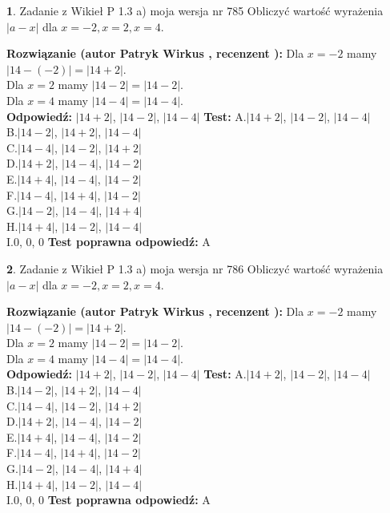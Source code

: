 \documentclass[12pt, a4paper]{article}
\theoremstyle{definition} %
\newtheorem{zad}{}
\newcommand{\zadStart}[1]{\begin{zad}#1\newline}
\newcommand{\zadStop}{\end{zad}}
\newcommand{\rozwStart}[2]{\noindent \textbf{Rozwiązanie (autor #1 , recenzent #2): }\newline}
\newcommand{\rozwStop}{\newline}
\newcommand{\odpStart}{\noindent \textbf{Odpowiedź:}\newline}
\newcommand{\odpStop}{\newline}
\newcommand{\testStart}{\noindent \textbf{Test:}\newline}
\newcommand{\testStop}{\newline}
\newcommand{\kluczStart}{\noindent \textbf{Test poprawna odpowiedź:}\newline}
\newcommand{\kluczStop}{\newline}
\begin{document}
\zadStart{Zadanie z Wikieł P 1.3 a) moja wersja nr 785}
Obliczyć wartość wyrażenia $|a - x|$ dla $x=-2,x=2,x=4$.
\zadStop
\rozwStart{Patryk Wirkus}{}
Dla $x = -2$ mamy $|14 - (-2)| = |14 + 2|$.\\
Dla $x = 2$ mamy $|14 - 2| = |14 - 2|$.\\
Dla $x = 4$ mamy $|14 - 4| = |14 - 4|$.\\
\rozwStop
\odpStart
$|14 + 2|$, $|14 - 2|$, $|14 - 4|$
\odpStop
\testStart
A.$|14 + 2|$, $|14 - 2|$, $|14 - 4|$\\
B.$|14 - 2|$, $|14 + 2|$, $|14 - 4|$\\
C.$|14 - 4|$, $|14 - 2|$, $|14 + 2|$\\
D.$|14 + 2|$, $|14 - 4|$, $|14 - 2|$\\
E.$|14 + 4|$, $|14 - 4|$, $|14 - 2|$\\
F.$|14 - 4|$, $|14 + 4|$, $|14 - 2|$\\
G.$|14 - 2|$, $|14 - 4|$, $|14 + 4|$\\
H.$|14 + 4|$, $|14 - 2|$, $|14 - 4|$\\
I.$0$, $0$, $0$
\testStop
\kluczStart
A
\kluczStop



\zadStart{Zadanie z Wikieł P 1.3 a) moja wersja nr 786}
Obliczyć wartość wyrażenia $|a - x|$ dla $x=-2,x=2,x=4$.
\zadStop
\rozwStart{Patryk Wirkus}{}
Dla $x = -2$ mamy $|14 - (-2)| = |14 + 2|$.\\
Dla $x = 2$ mamy $|14 - 2| = |14 - 2|$.\\
Dla $x = 4$ mamy $|14 - 4| = |14 - 4|$.\\
\rozwStop
\odpStart
$|14 + 2|$, $|14 - 2|$, $|14 - 4|$
\odpStop
\testStart
A.$|14 + 2|$, $|14 - 2|$, $|14 - 4|$\\
B.$|14 - 2|$, $|14 + 2|$, $|14 - 4|$\\
C.$|14 - 4|$, $|14 - 2|$, $|14 + 2|$\\
D.$|14 + 2|$, $|14 - 4|$, $|14 - 2|$\\
E.$|14 + 4|$, $|14 - 4|$, $|14 - 2|$\\
F.$|14 - 4|$, $|14 + 4|$, $|14 - 2|$\\
G.$|14 - 2|$, $|14 - 4|$, $|14 + 4|$\\
H.$|14 + 4|$, $|14 - 2|$, $|14 - 4|$\\
I.$0$, $0$, $0$
\testStop
\kluczStart
A
\kluczStop
\end{document}

